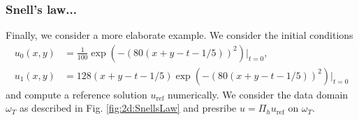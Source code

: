 \documentclass[sn-mathphys-num]{sn-jnl}
\numberwithin{equation}{section}
\newcommand{\ul}{\underline{u}}
\begin{document}
\begin{comment}
  \begin{figure}[!htbp]
    \begin{center}
        \begin{tikzpicture}[scale=0.72]
            \begin{groupplot}[%
                group style={%
                group size=1 by 1,
                horizontal sep=1.5cm,
                vertical sep=2cm,
                },0m,domain=1:4,xmode=linear,ymode=log, xlabel={}, ylabel={}, title={$\Vert u_0 - u_h \vert_{t = 0} \Vert_{H^1(\Omega)} + \Vert \partial_t (u-L_{\Delta t} \ul_1) \vert_{t = 0} \Vert_{L^2(\Omega)}$}, %
                legend pos=south east, %
                ]
                \addplot+[discard if not={order}{2},discard if not={L}{3},line width=1.1pt] table [x=contrast, y=H1-dt-at-t-0, col sep=comma] {../../wave_data_assimilation/data/jumpCoefs/2D_errors_simpleRefsol_noGCC2_Restricted.csv};
                \addplot+[discard if not={order}{2},discard if not={L}{3},line width=1.1pt,dashed] table [x=contrast, y=bestapprox-H1-dt-at-t-0, col sep=comma] {../../wave_data_assimilation/data/0

                \addplot[gray, dashed, domain=1:4] {1*(1/2^(-2))^(x-0.9)};
                \addplot[gray, dashed, domain=1:4] {1*(1/2^(-1))^(x-0.9)};
                
    
                \legend{$k=2$, best, $e^\Lambda$ (rescaled)}
            
            \end{groupplot}
        \end{tikzpicture}
    \end{center}
    \caption{Filippas lambda... (2D), noGCC}
  \end{figure}
\end{comment}

\subsubsection{Snell's law... }
\noindent Finally, we consider a more elaborate example. We consider the initial conditions 
\begin{align*}
    u_0 (x,y) &= \frac{1}{100} \exp(-(80(x+y-t-1/5))^2) \vert_{t=0}, \\
    u_1(x,y) &= 128(x+y-t-1/5) \exp(-(80(x+y-t-1/5))^2) \vert_{t = 0}
\end{align*}
and compute a reference solution $u_{\text{ref}}$ numerically. We consider the data domain $\omega_T$ as described in Fig. \ref{fig:2d:SnellsLaw} and presribe $u = \Pi_h u_{\text{ref}}$ on $\omega_T$. 
\end{document}
